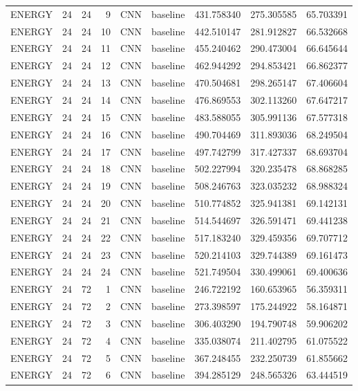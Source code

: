 \begin{table}
\begin{tabular}{lrrrllrrr}
ENERGY & 24 & 24 & 9 & CNN & baseline & 431.758340 & 275.305585 & 65.703391 \\
ENERGY & 24 & 24 & 10 & CNN & baseline & 442.510147 & 281.912827 & 66.532668 \\
ENERGY & 24 & 24 & 11 & CNN & baseline & 455.240462 & 290.473004 & 66.645644 \\
ENERGY & 24 & 24 & 12 & CNN & baseline & 462.944292 & 294.853421 & 66.862377 \\
ENERGY & 24 & 24 & 13 & CNN & baseline & 470.504681 & 298.265147 & 67.406604 \\
ENERGY & 24 & 24 & 14 & CNN & baseline & 476.869553 & 302.113260 & 67.647217 \\
ENERGY & 24 & 24 & 15 & CNN & baseline & 483.588055 & 305.991136 & 67.577318 \\
ENERGY & 24 & 24 & 16 & CNN & baseline & 490.704469 & 311.893036 & 68.249504 \\
ENERGY & 24 & 24 & 17 & CNN & baseline & 497.742799 & 317.427337 & 68.693704 \\
ENERGY & 24 & 24 & 18 & CNN & baseline & 502.227994 & 320.235478 & 68.868285 \\
ENERGY & 24 & 24 & 19 & CNN & baseline & 508.246763 & 323.035232 & 68.988324 \\
ENERGY & 24 & 24 & 20 & CNN & baseline & 510.774852 & 325.941381 & 69.142131 \\
ENERGY & 24 & 24 & 21 & CNN & baseline & 514.544697 & 326.591471 & 69.441238 \\
ENERGY & 24 & 24 & 22 & CNN & baseline & 517.183240 & 329.459356 & 69.707712 \\
ENERGY & 24 & 24 & 23 & CNN & baseline & 520.214103 & 329.744389 & 69.161473 \\
ENERGY & 24 & 24 & 24 & CNN & baseline & 521.749504 & 330.499061 & 69.400636 \\
ENERGY & 24 & 72 & 1 & CNN & baseline & 246.722192 & 160.653965 & 56.359311 \\
ENERGY & 24 & 72 & 2 & CNN & baseline & 273.398597 & 175.244922 & 58.164871 \\
ENERGY & 24 & 72 & 3 & CNN & baseline & 306.403290 & 194.790748 & 59.906202 \\
ENERGY & 24 & 72 & 4 & CNN & baseline & 335.038074 & 211.402795 & 61.075522 \\
ENERGY & 24 & 72 & 5 & CNN & baseline & 367.248455 & 232.250739 & 61.855662 \\
ENERGY & 24 & 72 & 6 & CNN & baseline & 394.285129 & 248.565326 & 63.444519 \\

\end{tabular}
\end{table}
